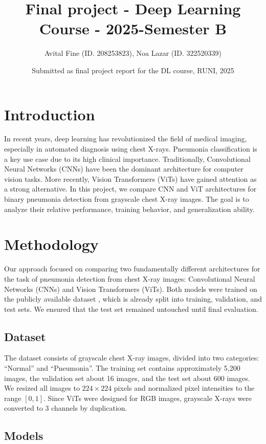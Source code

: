\documentclass{article}
\title{Final project - Deep Learning Course - 2025-Semester B}
\author{Avital Fine (ID. 208253823), Noa Lazar (ID. 322520339)}
\date{Submitted as final project report for the DL course, RUNI, 2025}
\begin{document}
\maketitle

\section{Introduction}
In recent years, deep learning has revolutionized the field of medical imaging, especially in automated diagnosis using chest X-rays. Pneumonia classification is a key use case due to its high clinical importance. Traditionally, Convolutional Neural Networks (CNNs) have been the dominant architecture for computer vision tasks. More recently, Vision Transformers (ViTs) \citep{dosovitskiy2020image} have gained attention as a strong alternative.  
In this project, we compare CNN and ViT architectures for binary pneumonia detection from grayscale chest X-ray images. The goal is to analyze their relative performance, training behavior, and generalization ability.

\section{Methodology}

Our approach focused on comparing two fundamentally different architectures for the task of pneumonia detection from chest X-ray images: Convolutional Neural Networks (CNNs) and Vision Transformers (ViTs). Both models were trained on the publicly available dataset \cite{kaggle_pneumonia}, which is already split into training, validation, and test sets. We ensured that the test set remained untouched until final evaluation.

\subsection{Dataset}
The dataset consists of grayscale chest X-ray images, divided into two categories: ``Normal'' and ``Pneumonia''. The training set contains approximately 5,200 images, the validation set about 16 images, and the test set about 600 images. We resized all images to $224 \times 224$ pixels and normalized pixel intensities to the range $[0,1]$. Since ViTs were designed for RGB images, grayscale X-rays were converted to 3 channels by duplication.

\subsection{Models}
\end{document}
